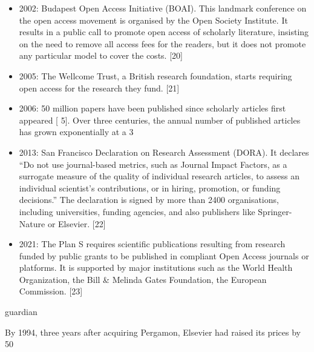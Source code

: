 \documentclass[10pt,compress,serif]{beamer}
\begin{document}
\begin{frame}[t]
\begin{itemize}
 \item 2002: Budapest Open Access Initiative (BOAI). This landmark conference on the open access movement is organised by the Open Society Institute. It results in a public call to promote open access of scholarly literature, insisting on the need to remove all access fees for the readers, but it does not promote any particular model to cover the costs. [20]
 \item 2005: The Wellcome Trust, a British research foundation, starts requiring open access for the research they fund. [21]
 \item 2006: 50 million papers have been published since scholarly articles first appeared [ 5]. Over three centuries, the annual number of published articles has grown exponentially at a 3%
 \item 2013: San Francisco Declaration on Research Assessment (DORA). It declares “Do not use journal-based metrics, such as Journal Impact Factors, as a surrogate measure of the quality of individual research articles, to assess an individual scientist’s contributions, or in hiring, promotion, or funding decisions.” The declaration is signed by more than 2400 organisations, including universities, funding agencies, and also publishers like Springer-Nature or Elsevier. [22]
 \item 2021: The Plan S requires scientific publications resulting from research funded by public grants to be published in compliant Open Access journals or platforms. It is supported by major institutions such as the World Health Organization, the Bill \& Melinda Gates Foundation, the European Commission. [23]

 \end{itemize}
\end{frame}

guardian

By 1994, three years after acquiring Pergamon, Elsevier had raised its prices by 50%


\end{document}

